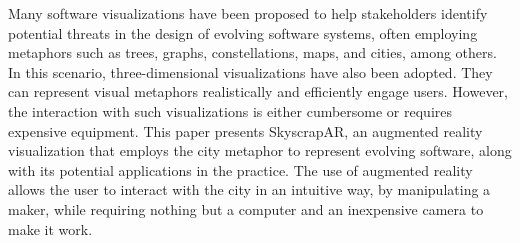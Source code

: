 Many software visualizations have been proposed to help stakeholders identify potential threats in the design of evolving software systems, often employing metaphors such as trees, graphs, constellations, maps, and cities, among others. In this scenario, three-dimensional visualizations have also been adopted. They can represent visual metaphors realistically and efficiently engage users. However, the interaction with such visualizations is either cumbersome or requires expensive equipment. This paper presents SkyscrapAR, an augmented reality visualization that employs the city metaphor to represent evolving software, along with its potential applications in the practice. The use of augmented reality allows the user to interact with the city in an intuitive way, by manipulating a maker, while requiring nothing but a computer and an inexpensive camera to make it work.